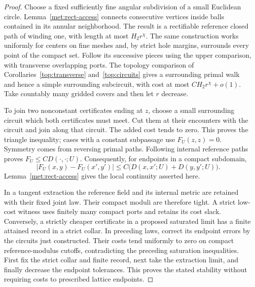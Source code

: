 \documentclass[11pt]{article}
\numberwithin{equation}{section}
\theoremstyle{definition}
\theoremstyle{remark}
\newcommand{\1}{\mathbf 1}
\begin{document}
\begin{proof}
Choose a fixed sufficiently fine angular subdivision of a small
Euclidean circle.  Lemma~\ref{met:rect-access} connects consecutive
vertices inside balls contained in its annular neighborhood.  The
result is a rectifiable reference closed path of winding one, with
length at most $H_2r^\chi$.  The same construction works uniformly for
centers on fine meshes and, by strict hole margins, surrounds every
point of the compact set.  Follow its successive pieces using the
upper comparison, with transverse overlapping ports.  The topology
comparison of Corollaries~\ref{top:transverse} and~\ref{top:circuits}
gives a surrounding primal walk and hence a simple
surrounding subcircuit, with cost at most
$CH_2r^\chi+o(1)$.  Take countably many gridded covers and then let
$r$ decrease.

To join two nonconstant certificates ending at $z$, choose a small
surrounding circuit which both certificates must meet.  Cut them at
their encounters with the circuit and join along that circuit.  The
added cost tends to zero.  This proves the triangle inequality; cases
with a constant subpassage use $F_U(z,z)=0$.  Symmetry comes from
reversing primal paths.  Following internal reference paths proves
$F_U\leq CD(\cdot,\cdot;U)$.  Consequently, for endpoints in a compact
subdomain,
\[
 |F_U(x,y)-F_U(x',y')|
 \leq C\bigl(D(x,x';U)+D(y,y';U)\bigr).
\]
Lemma~\ref{met:rect-access} gives the local continuity asserted here.

In a tangent extraction the reference field and its internal metric
are retained with their fixed joint law.  Their compact moduli are
therefore tight.  A strict low-cost witness uses finitely many compact
ports and retains its cost slack.  Conversely, a strictly cheaper
certificate in a proposed saturated limit has a finite attained
record in a strict collar.  In preceding laws, correct its endpoint
errors by the circuits just constructed.  Their costs tend uniformly
to zero on compact reference-modulus cutoffs, contradicting the
preceding saturation inequalities.  First fix the strict collar and
finite record, next take the extraction limit, and finally decrease
the endpoint tolerances.  This proves the stated stability without
requiring costs to prescribed lattice endpoints.
\end{proof}
\end{document}
